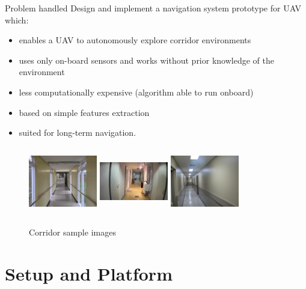 \documentclass[8pt]{beamer}
\begin{document}
\begin{frame}{Problem handled}
Design and implement a navigation system prototype for UAV which: 
\bigskip
  \begin{itemize}%
    \setlength\itemsep{1em}
    \item enables a UAV to autonomously explore corridor environments
    \item uses only on-board sensors and works without prior knowledge of the environment
    \item less computationally expensive (algorithm able to run onboard)
    \item based on simple features extraction
    \item suited for long-term navigation.
  \end{itemize}
  
  \begin{figure}[h]
  \centering
    \includegraphics[width=3cm, height=3cm]{images/corridor1.jpg}%
    \hspace{0.3cm}
    \includegraphics[width=3cm, height=3cm]{images/corridor2.jpg}%
    \hspace{0.3cm}
    \includegraphics[width=3cm, height=3cm]{images/corridor3.jpg}%
    \caption{Corridor sample images}
    \label{Figure: corridor_sample_images}%
\end{figure}
  
\end{frame}


\section{Setup and Platform}
\end{document}

